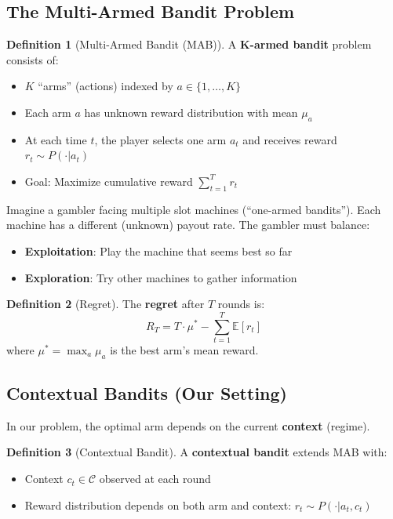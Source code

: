 \documentclass[11pt,a4paper]{article}
\theoremstyle{definition}
\newtheorem{definition}{Definition}[section]
\theoremstyle{plain}
\newcommand{\E}{\mathbb{E}}
\begin{document}
\subsection{The Multi-Armed Bandit Problem}

\begin{definition}[Multi-Armed Bandit (MAB)]
A \textbf{K-armed bandit} problem consists of:
\begin{itemize}
    \item $K$ ``arms'' (actions) indexed by $a \in \{1, \ldots, K\}$
    \item Each arm $a$ has unknown reward distribution with mean $\mu_a$
    \item At each time $t$, the player selects one arm $a_t$ and receives reward $r_t \sim P(\cdot | a_t)$
    \item Goal: Maximize cumulative reward $\sum_{t=1}^{T} r_t$
\end{itemize}
\end{definition}

\begin{intuition}
Imagine a gambler facing multiple slot machines (``one-armed bandits''). Each machine has a different (unknown) payout rate. The gambler must balance:
\begin{itemize}
    \item \textbf{Exploitation}: Play the machine that seems best so far
    \item \textbf{Exploration}: Try other machines to gather information
\end{itemize}
\end{intuition}

\begin{definition}[Regret]
The \textbf{regret} after $T$ rounds is:
\begin{equation}
R_T = T \cdot \mu^* - \sum_{t=1}^{T} \E[r_t]
\end{equation}
where $\mu^* = \max_a \mu_a$ is the best arm's mean reward.
\end{definition}

\subsection{Contextual Bandits (Our Setting)}

In our problem, the optimal arm depends on the current \textbf{context} (regime).

\begin{definition}[Contextual Bandit]
A \textbf{contextual bandit} extends MAB with:
\begin{itemize}
    \item Context $c_t \in \mathcal{C}$ observed at each round
    \item Reward distribution depends on both arm and context: $r_t \sim P(\cdot | a_t, c_t)$
\end{itemize}
\end{definition}
\end{document}
